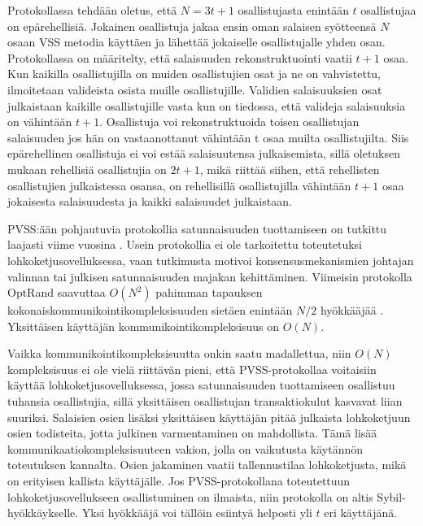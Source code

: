 Protokollassa tehdään oletus, että $N = 3t+1$ osallistujasta enintään $t$ osallistujaa on epärehellisiä. Jokainen osallistuja jakaa ensin oman salaisen syötteensä $N$ osaan VSS metodia käyttäen ja lähettää jokaiselle osallistujalle yhden osan. Protokollassa on määritelty, että salaisuuden rekonstruktuointi vaatii $t+1$ osaa. Kun kaikilla osallistujilla on muiden osallistujien osat ja ne on vahvistettu, ilmoitetaan valideista osista muille osallistujille. Validien salaisuuksien osat julkaistaan kaikille osallistujille vasta kun on tiedossa, että valideja salaisuuksia on vähintään $t+1$. Osallistuja voi rekonstruktuoida toisen osallistujan salaisuuden jos hän on vastaanottanut vähintään t osaa muilta osallistujilta. Siis epärehellinen osallistuja ei voi estää salaisuutensa julkaisemista, sillä oletuksen mukaan rehellisiä osallistujia on $2t+1$, mikä riittää siihen, että rehellisten osallistujien julkaistessa osansa, on rehellisillä osallistujilla vähintään $t+1$ osaa jokaisesta salaisuudesta ja kaikki salaisuudet julkaistaan.

PVSS:ään pohjautuvia protokollia satunnaisuuden tuottamiseen on tutkittu laajasti viime vuosina \cite{bhat2022optrand, bhat2021randpiper, schindler_hydrand_2020, syta_scalable_2017} . Usein protokollia ei ole tarkoitettu toteutetuksi lohkoketjusovelluksessa, vaan tutkimusta motivoi konsensusmekanismien johtajan valinnan tai julkisen satunnaisuuden majakan kehittäminen. Viimeisin protokolla OptRand saavuttaa $O(N^2)$ pahimman tapauksen kokonaiskommunikointikompleksisuuden sietäen enintään $N/2$ hyökkääjää \cite{bhat2022optrand}. Yksittäisen käyttäjän kommunikointikompleksisuus on $O(N)$.

Vaikka kommunikointikompleksisuutta onkin saatu madallettua, niin $O(N)$ kompleksisuus ei ole vielä riittävän pieni, että PVSS-protokollaa voitaisiin käyttää lohkoketjusovelluksessa, jossa satunnaisuuden tuottamiseen osallistuu tuhansia osallistujia, sillä yksittäisen osallistujan transaktiokulut kasvavat liian suuriksi. Salaisien osien lisäksi yksittäisen käyttäjän pitää julkaista lohkoketjuun osien todisteita, jotta julkinen varmentaminen on mahdollista. Tämä lisää kommunikaatiokompleksisuuteen vakion, jolla on vaikutusta käytännön toteutuksen kannalta. Osien jakaminen vaatii tallennustilaa lohkoketjusta, mikä on erityisen kallista käyttäjälle. Jos PVSS-protokollana toteutettuun lohkoketjusovellukseen osallistuminen on ilmaista, niin protokolla on altis Sybil-hyökkäykselle. Yksi hyökkääjä voi tällöin esiintyä helposti yli $t$ eri käyttäjänä.

